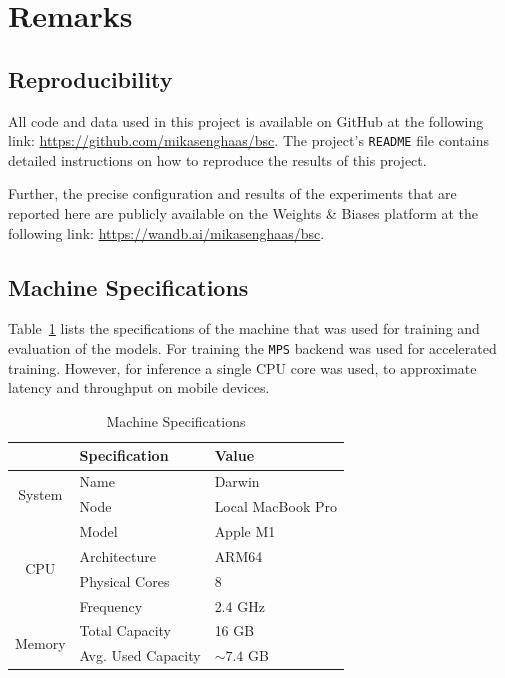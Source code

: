 \documentclass[a4paper]{article}
\begin{document}

  \section{Remarks} %
  \label{sec:remarks}

  \subsection{Reproducibility} %
  \label{sub:reproducibility}

  All code and data used in this project is available on GitHub at the
  following link: \url{https://github.com/mikasenghaas/bsc}. The project's 
  \texttt{README} file contains detailed instructions on how to reproduce the
  results of this project.

  Further, the precise configuration and results of the experiments that are
  reported here are publicly available on the Weights \& Biases platform at the
  following link: \url{https://wandb.ai/mikasenghaas/bsc}.


  \subsection{Machine Specifications} %
  \label{sub:machine-specs}

  Table~\ref{tab:machine-specs} lists the specifications of the machine that was
  used for training and evaluation of the models. For training the \texttt{MPS}
  backend was used for accelerated training. However, for inference a single CPU
  core was used, to approximate latency and throughput on mobile devices.

  \begin{table}[ht]
    \centering
    \begin{tabular}{cll}
     \toprule
     & Specification & Value \\
     \midrule

     \multirow{2}{*}{System} & Name & Darwin \\
     \vspace{0.1cm}
     & Node & Local MacBook Pro \\

     \multirow{4}{*}{CPU} & Model & Apple M1 \\
     & Architecture & ARM64 \\
     & Physical Cores & 8 \\
     \vspace{0.1cm}
     & Frequency & 2.4 GHz \\

     \multirow{2}{*}{Memory} & Total Capacity & 16 GB \\
     & Avg. Used Capacity & $\sim 7.4$ GB \\

     \bottomrule
    \end{tabular}
    \caption{Machine Specifications}
    \label{tab:machine-specs}
  \end{table}
  


  \newpage
  
  
\end{document}

